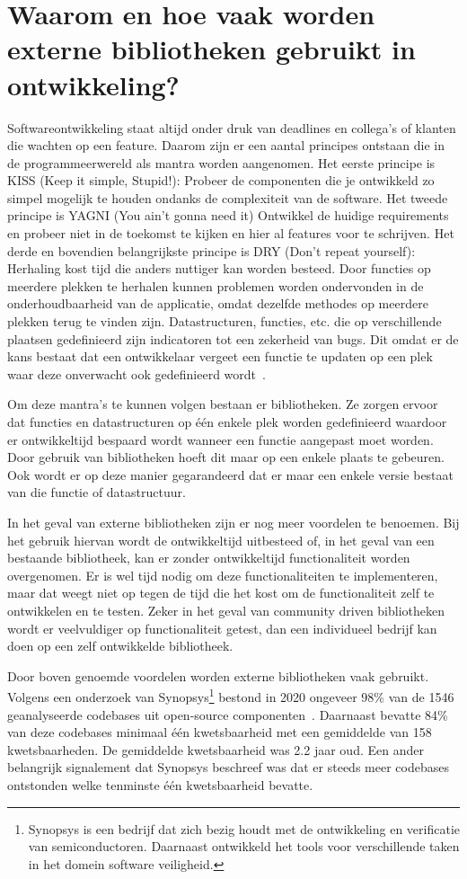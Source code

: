 \section{Waarom en hoe vaak worden externe bibliotheken gebruikt in ontwikkeling?}\label{sec:waarom-hoe}
Softwareontwikkeling staat altijd onder druk van deadlines en collega's of klanten die wachten op een feature. Daarom zijn er een aantal principes ontstaan die in de programmeerwereld als mantra worden aangenomen. Het eerste principe is KISS (Keep it simple, Stupid!): Probeer de componenten die je ontwikkeld zo simpel mogelijk te houden ondanks de complexiteit van de software. Het tweede principe is YAGNI (You ain't gonna need it) Ontwikkel de huidige requirements en probeer niet in de toekomst te kijken en hier al features voor te schrijven. Het derde en bovendien belangrijkste principe is DRY (Don't repeat yourself): Herhaling kost tijd die anders nuttiger kan worden besteed. Door functies op meerdere plekken te herhalen kunnen problemen worden ondervonden in de onderhoudbaarheid van de applicatie, omdat dezelfde methodes op meerdere plekken terug te vinden zijn. Datastructuren, functies, etc. die op verschillende plaatsen gedefinieerd zijn indicatoren tot een zekerheid van bugs. Dit omdat er de kans bestaat dat een ontwikkelaar vergeet een functie te updaten op een plek waar deze onverwacht ook gedefinieerd wordt~\citep{Papadopoulo:2021}.

Om deze mantra's te kunnen volgen bestaan er bibliotheken. Ze zorgen ervoor dat functies en datastructuren op één enkele plek worden gedefinieerd waardoor er ontwikkeltijd bespaard wordt wanneer een functie aangepast moet worden. Door gebruik van bibliotheken hoeft dit maar op een enkele plaats te gebeuren. Ook wordt er op deze manier gegarandeerd dat er maar een enkele versie bestaat van die functie of datastructuur.

In het geval van externe bibliotheken zijn er nog meer voordelen te benoemen. Bij het gebruik hiervan wordt de ontwikkeltijd uitbesteed of, in het geval van een bestaande bibliotheek, kan er zonder ontwikkeltijd functionaliteit worden overgenomen. Er is wel tijd nodig om deze functionaliteiten te implementeren, maar dat weegt niet op tegen de tijd die het kost om de functionaliteit zelf te ontwikkelen en te testen. Zeker in het geval van community driven bibliotheken wordt er veelvuldiger op functionaliteit getest, dan een individueel bedrijf kan doen op een zelf ontwikkelde bibliotheek.

Door boven genoemde voordelen worden externe bibliotheken vaak gebruikt. Volgens een onderzoek van Synopsys\footnote{Synopsys is een bedrijf dat zich bezig houdt met de ontwikkeling en verificatie van semiconductoren. Daarnaast ontwikkeld het tools voor verschillende taken in het domein software veiligheid.} bestond in 2020 ongeveer 98\% van de 1546 geanalyseerde codebases uit open-source componenten~\citep{Synopsys:2021}. Daarnaast bevatte 84\% van deze codebases minimaal één kwetsbaarheid met een gemiddelde van 158 kwetsbaarheden. De gemiddelde kwetsbaarheid was 2.2 jaar oud. Een ander belangrijk signalement dat Synopsys beschreef was dat er steeds meer codebases ontstonden welke tenminste één kwetsbaarheid bevatte.

